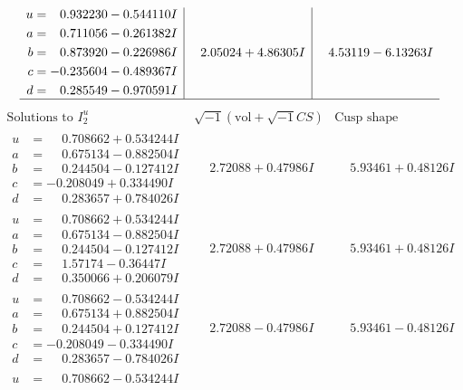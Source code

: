 \documentclass[1p]{elsarticle_modified}
\theoremstyle{definition}
\newcommand{\I}{\sqrt{-1}}
\begin{document}
$$\begin{array}{c|c|c}
\begin{aligned}
u &= \phantom{-}0.932230 - 0.544110 I \\
a &= \phantom{-}0.711056 - 0.261382 I \\
b &= \phantom{-}0.873920 - 0.226986 I \\
c &= -0.235604 - 0.489367 I \\
d &= \phantom{-}0.285549 - 0.970591 I\end{aligned}
 & \phantom{-}2.05024 + 4.86305 I & \phantom{-}4.53119 - 6.13263 I\\
 \hline 
 \end{array}$$\newpage$$\begin{array}{c|c|c}  
\text{Solutions to }I^u_{2}& \I (\text{vol} + \sqrt{-1}CS) & \text{Cusp shape}\\
 \hline 
\begin{aligned}
u &= \phantom{-}0.708662 + 0.534244 I \\
a &= \phantom{-}0.675134 - 0.882504 I \\
b &= \phantom{-}0.244504 - 0.127412 I \\
c &= -0.208049 + 0.334490 I \\
d &= \phantom{-}0.283657 + 0.784026 I\end{aligned}
 & \phantom{-}2.72088 + 0.47986 I & \phantom{-}5.93461 + 0.48126 I \\ \hline\begin{aligned}
u &= \phantom{-}0.708662 + 0.534244 I \\
a &= \phantom{-}0.675134 - 0.882504 I \\
b &= \phantom{-}0.244504 - 0.127412 I \\
c &= \phantom{-}1.57174 - 0.36447 I \\
d &= \phantom{-}0.350066 + 0.206079 I\end{aligned}
 & \phantom{-}2.72088 + 0.47986 I & \phantom{-}5.93461 + 0.48126 I \\ \hline\begin{aligned}
u &= \phantom{-}0.708662 - 0.534244 I \\
a &= \phantom{-}0.675134 + 0.882504 I \\
b &= \phantom{-}0.244504 + 0.127412 I \\
c &= -0.208049 - 0.334490 I \\
d &= \phantom{-}0.283657 - 0.784026 I\end{aligned}
 & \phantom{-}2.72088 - 0.47986 I & \phantom{-}5.93461 - 0.48126 I \\ \hline\begin{aligned}
u &= \phantom{-}0.708662 - 0.534244 I \\

\end{aligned}
\end{array}$$
\end{document}
